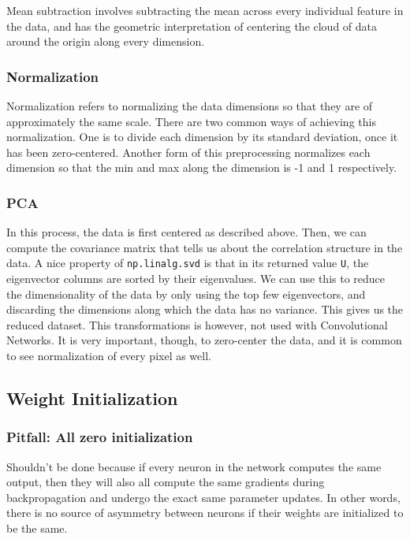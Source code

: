 \documentclass[letterpaper]{article}
\begin{document}
Mean subtraction involves subtracting the mean across every individual feature in the data, and has the geometric interpretation of centering the cloud of data around the origin along every dimension. 

\subsubsection{Normalization}

Normalization refers to normalizing the data dimensions so that they are of approximately the same scale. There are two common ways of achieving this normalization. One is to divide each dimension by its standard deviation, once it has been zero-centered. Another form of this preprocessing normalizes each dimension so that the min and max along the dimension is -1 and 1 respectively.

\subsubsection{PCA}

In this process, the data is first centered as described above. Then, we can compute the covariance matrix that tells us about the correlation structure in the data. A nice property of \texttt{np.linalg.svd} is that in its returned value \texttt{U}, the eigenvector columns are sorted by their eigenvalues. We can use this to reduce the dimensionality of the data by only using the top few eigenvectors, and discarding the dimensions along which the data has no variance. This gives us the reduced dataset. This transformations is however, not used with Convolutional Networks. It is very important, though,  to zero-center the data, and it is common to see normalization of every pixel as well.

\subsection{Weight Initialization}

\subsubsection{Pitfall: All zero initialization}

Shouldn't be done because if every neuron in the network computes the same output, then they will also all compute the same gradients during backpropagation and undergo the exact same parameter updates. In other words, there is no source of asymmetry between neurons if their weights are initialized to be the same.
\end{document}
